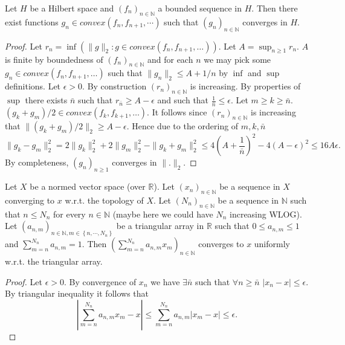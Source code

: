 \begin{lemma}\label{lem:komlos_aux}
  Let $H$ be a Hilbert space and $(f_n)_{n\in\mathbb{N}}$ a bounded sequence in $H$. Then there exist functions $g_n\in convex(f_n,f_{n+1},\cdots)$ such that $(g_n)_{n\in\mathbb{N}}$ converges in $H$.
\end{lemma}

\begin{proof}
  Let $r_n = \inf(\|g\|_2:g\in convex(f_n, f_{n+1},\ldots))$.
  Let $A=\sup_{n\geq1} r_n$. $A$ is finite by boundedness of $(f_n)_{n\in\mathbb{N}}$ and
  for each $n$ we  may pick some $g_n\in convex(f_n, f_{n+1},\ldots)$ such that $ \|g_n\|_2\leq A+1/n$ by $\inf$ and $\sup$ definitions.
  Let $\epsilon>0$.
  By construction $(r_n)_{n\in\mathbb{N}}$ is increasing. By properties of $\sup$ there exists $\bar{n}$ such that $r_{\bar{n}}\geq A-\epsilon$ and such that $\frac{1}{\bar{n}}\leq\epsilon$.
  Let $m\geq k\geq \bar{n}$. $(g_k+g_m)/2 \in convex(f_k,f_{k+1},\ldots)$. It follows since $(r_n)_{n\in\mathbb{N}}$ is increasing that
  $\|(g_k+g_m)/2\|_2\geq A-\epsilon$.
  Hence due to the ordering of $m,k,\bar{n}$
  $$ \|g_k-g_m\|_2^2=2 \|g_k\|_2^2+2\|g_m\|_2^2- \|g_k+g_m\|_2^2
  \leq 4(A+\frac{1}{\bar{n}})^2-4(A-\epsilon)^2\leq 16A\epsilon.$$ By completeness, $(g_n)_{n\geq1}$  converges in $\|.\|_2$.
\end{proof}


\begin{lemma}\label{lem:convex_of_converg_seq_is_converg}
  Let $X$ be a normed vector space (over $\mathbb{R}$).
  Let $(x_n)_{n\in\mathbb{N}}$ be a sequence in $X$ converging to $x$ w.r.t. the topology of $X$.
  Let $(N_n)_{n\in\mathbb{N}}$ be a sequence in $\mathbb{N}$ such that $n\leq N_n$ for every $n\in\mathbb{N}$ (maybe here we could have $N_n$ increasing WLOG).
  Let $(a_{n,m})_{n\in\mathbb{N},m\in\left\lbrace n,\cdots,N_n\right\rbrace}$ be a triangular array in $\mathbb{R}$ such that $0\leq a_{n,m}\leq 1$ and $\sum_{m=n}^{N_n}a_{n,m}=1$.
  Then $(\sum_{m=n}^{N_n}a_{n,m}x_m)_{n\in\mathbb{N}}$ converges to $x$ uniformly w.r.t. the triangular array.
\end{lemma}

\begin{proof}
  Let $\epsilon>0$.
  By convergence of $x_n$ we have $\exists \bar{n}$ such that $\forall n\geq\bar{n}$ $|x_n-x|\leq \epsilon$.
  By triangular inequality it follows that
  $$
  |\sum_{m=n}^{N_n}a_{n,m}x_m - x|\leq \sum_{m=n}^{N_n}a_{n,m}|x_m-x|\leq\epsilon.
  $$
\end{proof}


